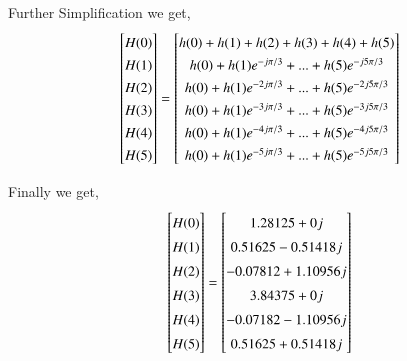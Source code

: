 \documentclass[journal,12pt,twocolumn]{IEEEtran}
\renewcommand\thesection{\arabic{section}}
\begin{document}
\begin{enumerate}[label=\thesection.\arabic*.,ref=\thesection.\theenumi]
Further Simplification we get,
\begin{align}
    \renewcommand{\arraystretch}{1.35}
    \begin{bmatrix} H(0) \\ H(1) \\ H(2) \\ H(3) \\ H(4) \\ H(5) \end{bmatrix}
=
\begin{bmatrix}
h(0) + h(1) + h(2) + h(3) + h(4) + h(5) \\h(0) + h(1)e^{-j\pi /3} + ... + h(5)e^{-j5\pi /3}\\h(0) + h(1)e^{-2j\pi /3} + ... + h(5)e^{-2j5\pi /3}\\h(0) + h(1)e^{-3j\pi /3} + ... + h(5)e^{-3j5\pi /3}\\
h(0) + h(1)e^{-4j\pi /3} + ... + h(5)e^{-4j5\pi /3}\\h(0) + h(1)e^{-5j\pi /3} + ... + h(5)e^{-5j5\pi /3}
\end{bmatrix}
\end{align}



Finally we get,
\begin{equation}
\renewcommand{\arraystretch}{1.45}
\setlength\arraycolsep{0.01pt}
\begin{bmatrix} 
H(0) \\ H(1) \\ H(2) \\ H(3) \\ H(4) \\ H(5) 
\end{bmatrix}
=
\begin{bmatrix}
1.28125+0j \\ 0.51625-0.51418j \\ -0.07812+1.10956j  \\ 3.84375+0j \\ -0.07182-1.10956j \\ 0.51625+0.51418j
\end{bmatrix}
\end{equation}




\end{enumerate}
\end{document}
